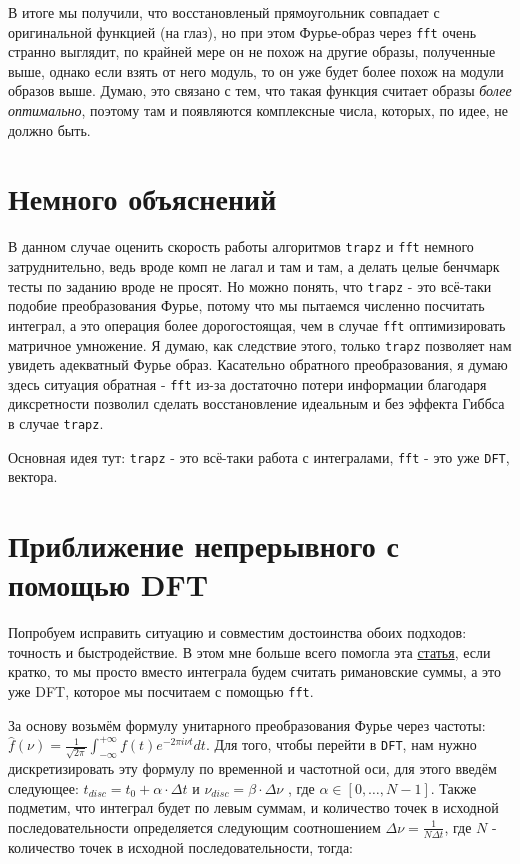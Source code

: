 В итоге мы получили, что восстановленый прямоугольник совпадает с оригинальной функцией (на глаз), но при этом Фурье-образ через \texttt{fft} очень странно выглядит, 
по крайней мере он не похож на другие образы, полученные выше, однако если взять от него модуль, то он уже будет более похож на модули образов выше. 
Думаю, это связано с тем, что такая функция считает образы \textit{более оптимально}, поэтому там и появляются комплексные числа, которых, по идее, не должно быть.

\section{Немного объяснений}

В данном случае оценить скорость работы алгоритмов \texttt{trapz} и \texttt{fft} немного затруднительно, ведь вроде комп не лагал и там и там, а делать целые бенчмарк тесты по заданию вроде не просят.
Но можно понять, что \texttt{trapz} - это всё-таки подобие преобразования Фурье, потому что мы пытаемся численно посчитать интеграл, а это операция более дорогостоящая, чем в случае \texttt{fft} оптимизировать матричное умножение.
Я думаю, как следствие этого, только \texttt{trapz} позволяет нам увидеть адекватный Фурье образ. Касательно обратного преобразования, я думаю здесь ситуация обратная - \texttt{fft} из-за достаточно потери информации благодаря диксретности позволил сделать восстановление идеальным и без эффекта Гиббса в случае \texttt{trapz}.

Основная идея тут: \texttt{trapz} - это всё-таки работа с интегралами, \texttt{fft} - это уже \texttt{DFT}, вектора.

\section{Приближение непрерывного с помощью DFT}

Попробуем исправить ситуацию и совместим достоинства обоих подходов: точность и быстродействие. В этом мне больше всего помогла эта \href{https://medium.com/@alessandrotakeshimorita/actually-computing-fourier-transforms-in-bf1a645a151c}{статья}, если кратко, то мы просто вместо интеграла будем считать римановские суммы, а это уже DFT, которое мы посчитаем с помощью \texttt{fft}.

За основу возьмём формулу унитарного преобразования Фурье через частоты: $\hat{f}(\nu) = \frac{1}{\sqrt{2\pi}}\int_{-\infty}^{+\infty}f(t)e^{-2\pi i \nu t}dt$. Для того, чтобы перейти в \texttt{DFT}, нам нужно дискретизировать эту формулу по временной и частотной оси,
для этого введём следующее: $t_{disc} = t_0 + \alpha\cdot\Delta t$ и $\nu_{disc} = \beta\cdot\Delta\nu$ , где $\alpha \in[0,\dots,N-1]$. Также подметим, что интеграл будет по левым суммам, и количество точек в 
исходной последовательности определяется следующим соотношением $\Delta\nu = \frac{1}{N\Delta t}$, где $N$ - количество точек в исходной последовательности, тогда:

